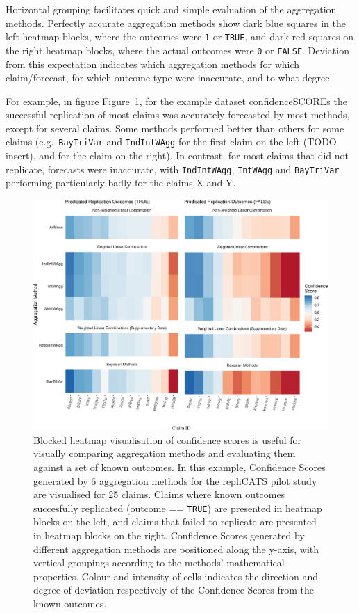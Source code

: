 \documentclass[article]{jss}
\begin{document}
Horizontal grouping facilitates quick and simple evaluation of the
aggregation methods. Perfectly accurate aggregation methods show dark
blue squares in the left heatmap blocks, where the outcomes were
\texttt{1} or \texttt{TRUE}, and dark red squares on the right heatmap
blocks, where the actual outcomes were \texttt{0} or \texttt{FALSE}.
Deviation from this expectation indicates which aggregation methods for
which claim/forecast, for which outcome type were inaccurate, and to
what degree.

For example, in figure Figure~\ref{fig-heatmap}, for the example dataset
{confidenceSCOREs} the successful replication of most claims was
accurately forecasted by most methods, except for several claims. Some
methods performed better than others for some claims
(e.g.~\texttt{BayTriVar} and \texttt{IndIntWAgg} for the first claim on
the left (TODO insert), and for the claim on the right). In contrast,
for most claims that did not replicate, forecasts were inaccurate, with
\texttt{IndIntWAgg}, \texttt{IntWAgg} and \texttt{BayTriVar} performing
particularly badly for the claims X and Y.

\begin{figure}

{\centering \includegraphics{ms_files/figure-pdf/fig-heatmap-1.pdf}

}

\caption{\label{fig-heatmap}Blocked heatmap visualisation of confidence
scores is useful for visually comparing aggregation methods and
evaluating them against a set of known outcomes. In this example,
Confidence Scores generated by 6 aggregation methods for the repliCATS
pilot study are visualised for 25 claims. Claims where known outcomes
succesfully replicated (outcome == \texttt{TRUE}) are presented in
heatmap blocks on the left, and claims that failed to replicate are
presented in heatmap blocks on the right. Confidence Scores generated by
different aggregation methods are positioned along the y-axis, with
vertical groupings according to the methods' mathematical properties.
Colour and intensity of cells indicates the direction and degree of
deviation respectively of the Confidence Scores from the known
outcomes.}

\end{figure}
\end{document}

